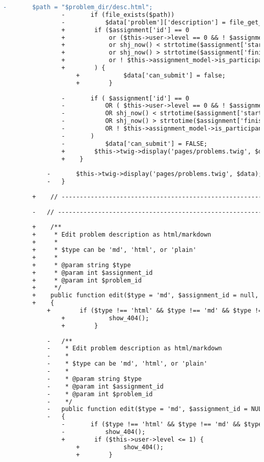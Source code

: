\begin{lstlisting}[language=diff, caption=Perubahan pada kode Problems.php]
				-		$path = "$problem_dir/desc.html";
				-		if (file_exists($path))
				-			$data['problem']['description'] = file_get_contents($path);
				+        if ($assignment['id'] == 0
				+            or ($this->user->level == 0 && ! $assignment['open'])
				+            or shj_now() < strtotime($assignment['start_time'])
				+            or shj_now() > strtotime($assignment['finish_time']) + $assignment['extra_time'] // deadline = finish_time + extra_time
				+            or ! $this->assignment_model->is_participant($assignment['participants'], $this->user->username)
				+        ) {
					+            $data['can_submit'] = false;
					+        }
				
				-		if ( $assignment['id'] == 0
				-			OR ( $this->user->level == 0 && ! $assignment['open'] )
				-			OR shj_now() < strtotime($assignment['start_time'])
				-			OR shj_now() > strtotime($assignment['finish_time'])+$assignment['extra_time'] // deadline = finish_time + extra_time
				-			OR ! $this->assignment_model->is_participant($assignment['participants'], $this->user->username)
				-		)
				-			$data['can_submit'] = FALSE;
				+        $this->twig->display('pages/problems.twig', $data);
				+    }
			
			-		$this->twig->display('pages/problems.twig', $data);
			-	}
		
		+    // ------------------------------------------------------------------------
		
		-	// ------------------------------------------------------------------------
		
		+    /**
		+     * Edit problem description as html/markdown
		+     *
		+     * $type can be 'md', 'html', or 'plain'
		+     *
		+     * @param string $type
		+     * @param int $assignment_id
		+     * @param int $problem_id
		+     */
		+    public function edit($type = 'md', $assignment_id = null, $problem_id = 1)
		+    {
			+        if ($type !== 'html' && $type !== 'md' && $type !== 'plain') {
				+            show_404();
				+        }
			
			-	/**
			-	 * Edit problem description as html/markdown
			-	 *
			-	 * $type can be 'md', 'html', or 'plain'
			-	 *
			-	 * @param string $type
			-	 * @param int $assignment_id
			-	 * @param int $problem_id
			-	 */
			-	public function edit($type = 'md', $assignment_id = NULL, $problem_id = 1)
			-	{
				-		if ($type !== 'html' && $type !== 'md' && $type !== 'plain')
				-			show_404();
				+        if ($this->user->level <= 1) {
					+            show_404();
					+        }
				

\end{lstlisting}
